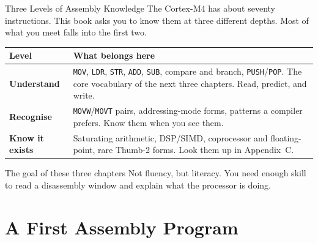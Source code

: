 \documentclass[9pt,aspectratio=169,xcolor=table]{beamer}
\newcommand{\striped}{\rowcolors{1}{white}{stripe}}
\begin{document}
\begin{frame}{Three Levels of Assembly Knowledge}
    \leavevmode
    {\small The Cortex-M4 has about \alert{seventy} instructions. This book
    asks you to know them at three different depths. Most of what you meet
    falls into the first two.}

    \vspace{3mm}
    \begin{center}
    {\small
    \striped
    \begin{tabular}{@{}l R{.68\textwidth}@{}}
        \toprule
        \textbf{Level} & \textbf{What belongs here} \\
        \midrule
        \textbf{Understand}
        & \texttt{MOV}, \texttt{LDR}, \texttt{STR}, \texttt{ADD}, \texttt{SUB},
          compare and branch, \texttt{PUSH}/\texttt{POP}. The core vocabulary
          of the next three chapters. Read, predict, and write. \\
        \textbf{Recognise}
        & \texttt{MOVW}/\texttt{MOVT} pairs, addressing-mode forms, patterns a
          compiler prefers. Know them when you see them. \\
        \textbf{Know it exists}
        & Saturating arithmetic, DSP/SIMD, coprocessor and floating-point,
          rare Thumb-2 forms. Look them up in Appendix~C. \\
        \bottomrule
    \end{tabular}}
    \end{center}

    \vspace{3mm}
    \begin{block}{The goal of these three chapters}
        Not fluency, but \alert{literacy}. You need enough skill to read a
        disassembly window and explain what the processor is doing.
    \end{block}
\end{frame}

\section{A First Assembly Program}
\end{document}
